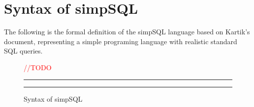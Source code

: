 \documentclass[12pt,letter]{article}
\begin{document}


\section{Syntax of simpSQL}
The following is the formal definition of the simpSQL language based on Kartik's document,
representing a simple programing language with realistic standard SQL queries.

\begin{figure}[h]
\textcolor{red}{//TODO}
\\
	\hrule \hrule 
\caption{Syntax of simpSQL}
\label{fig:standard}
\end{figure}


\end{document}
